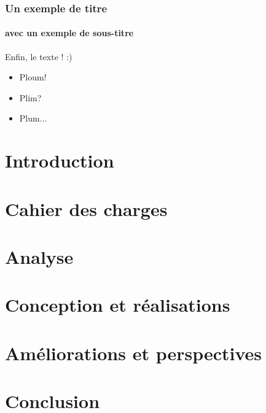 \documentclass{beamer}
\begin{document}
		
		\begin{frame}
			\frametitle{Un exemple de titre}
			\framesubtitle{avec un exemple de sous-titre}
			Enfin, le texte ! :)
		\end{frame}
		
		\begin{frame}
			\begin{itemize}
				\item<1,3> Ploum!
				\item<2-4> Plim?
				\item Plum...
			\end{itemize}
		\end{frame}
		
		
		
		
		
		
		\section{Introduction}
		
		
		\section{Cahier des charges}
		
		
		\section{Analyse}
		
		
		\section{Conception et réalisations}
		
		 
		\section{Améliorations et perspectives}
		
		
		\section{Conclusion}
		
		
		
		
	
\end{document}
